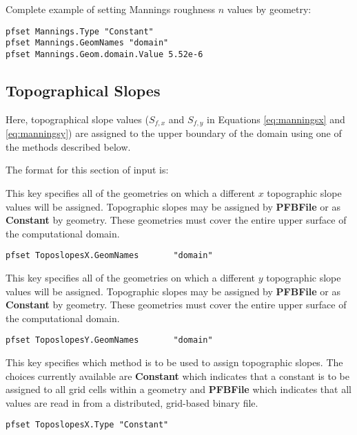 Complete example of setting Mannings roughness $n$ values by geometry:
\begin{display}\begin{verbatim}
pfset Mannings.Type "Constant"
pfset Mannings.GeomNames "domain"
pfset Mannings.Geom.domain.Value 5.52e-6
\end{verbatim}\end{display}

\subsection{Topographical Slopes}
\label{Topographical Slopes}

Here, topographical slope values ($S_{f,x}$ and $S_{f,y}$ in Equations \ref{eq:manningsx} and \ref{eq:manningsy}) are assigned to the upper boundary of the domain using one of the methods described below.

The format for this section of input is:

{
This key specifies all of the geometries on which a different $x$ topographic slope values will be 
assigned.  Topographic slopes may be assigned by {\bf PFBFile} or as {\bf Constant} by geometry.  These geometries must cover the entire upper surface of the computational domain.
}
\begin{display}\begin{verbatim}
pfset ToposlopesX.GeomNames       "domain"
\end{verbatim}\end{display}

{
This key specifies all of the geometries on which a different $y$ topographic slope values will be 
assigned.  Topographic slopes may be assigned by {\bf PFBFile} or as {\bf Constant} by geometry.  These geometries must cover the entire upper surface of the computational domain.
}
\begin{display}\begin{verbatim}
pfset ToposlopesY.GeomNames       "domain"
\end{verbatim}\end{display}

{
This key specifies which method is to be used to assign topographic slopes.  The choices currently
available are {\bf Constant} which indicates that a constant is to be
assigned to all grid cells within a geometry and {\bf PFBFile} which indicates that all values are read in from a distributed, grid-based \parflow{} binary file.
}
\begin{display}\begin{verbatim}
pfset ToposlopesX.Type "Constant"
\end{verbatim}\end{display}

